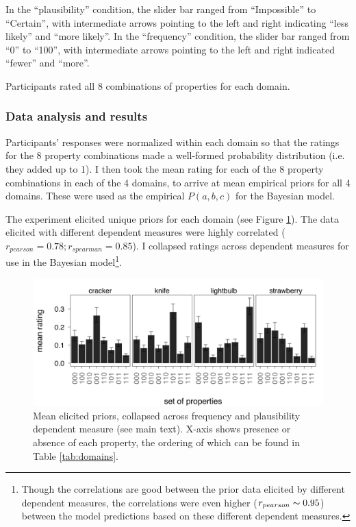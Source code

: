 \documentclass{llncs} %
\begin{document}
In the ``plausibility'' condition, the slider bar ranged from ``Impossible'' to ``Certain'', with intermediate arrows pointing to the left and right indicating ``less likely'' and ``more likely''. In the ``frequency'' condition, the slider bar ranged from ``0'' to ``100'', with intermediate arrows pointing to the left and right indicated ``fewer'' and ``more''. 

Participants rated all 8 combinations of properties for each domain.

\subsubsection{Data analysis and results}

Participants' responses were normalized within each domain so that the ratings for the 8 property combinations made a well-formed probability distribution (i.e. they added up to 1). I then took the mean rating for each of the 8 property combinations in each of the 4 domains, to arrive at mean empirical priors for all 4 domains. These were used as the empirical $P(a,b,c)$ for the Bayesian model. 

The experiment elicited unique priors for each domain (see Figure \ref{fig:priors}). The data elicited with different dependent measures were highly correlated ($r_{pearson} = 0.78; r_{spearman} = 0.85$). I collapsed ratings across dependent measures for use in the Bayesian model\footnote{Though the correlations are good between the prior data elicited by different dependent measures, the correlations were even higher ($r_{pearson} \thicksim 0.95$) between the model predictions based on these different dependent measures.}.

\begin{figure}
\centering
    \includegraphics[width=\columnwidth]{priors}
    \caption{Mean elicited priors, collapsed across frequency and plausibility dependent measure (see main text). X-axis shows presence or absence of each property, the ordering of which can be found in Table \ref{tab:domains}.}
  \label{fig:priors}
\end{figure}
\end{document}
